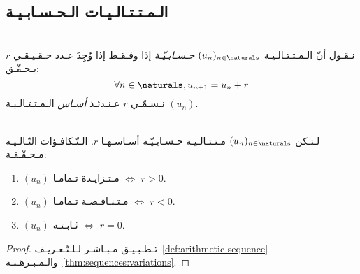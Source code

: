 \subsection{الـمـتـتـالـيـات الـحـسـابـيـة}%
\label{subsec:sequences:special:arithmetic}

\begin{definition}%
    \label{def:arithmetic-sequence}\ \\
    نـقـول أنّ الـمـتـتـالـيـة \((u_n)_{n \in \naturals}\) \emph{حـسـابـيّـة}
    إذا وفـقـط إذا وُجِدَ عـدد حـقـيـقـي \(r\) يـحـقّـق:
    \[\forall n \in \naturals, u_{n+1} = u_n + r\]
    نـسـمّـي \(r\) عـنـدئـذ \emph{أسـاس} الـمـتـتـالـيـة \((u_n)\).
\end{definition}

\begin{proposition}%
    \label{prop:arithmetic-sequence:variation}\ \\
    لـتـكن \((u_n)_{n \in \naturals}\) مـتـتـالـيـة حـسـابـيّـة أسـاسـهـا \(r\).
    الـتّـكافـؤات التّـالـيـة مـحـقّـقـة:
    \begin{enumerate}
        \item \((u_n)\) مـتـزايـدة تـمامـا \(\iff\) \(r > 0\).
        \item \((u_n)\) مـتـنـاقـصـة تـمامـا \(\iff\) \(r < 0\).
        \item \((u_n)\) ثـابـتـة \(\iff\) \(r = 0\).
    \end{enumerate}
\end{proposition}
\begin{proof}
    تـطـبـيـق مـبـاشـر لـلـتّـعـريـف~\ref{def:arithmetic-sequence}
    والـمـبـرهـنـة~\ref{thm:sequences:variations}.
\end{proof}
